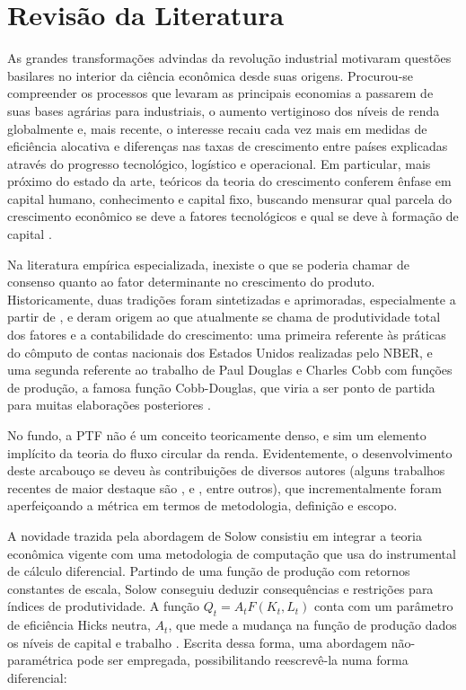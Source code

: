 \documentclass[
  12pt,
  a4paper,
  oneside,
  brazil,
  chapter=TITLE,
  section=TITLE
]{abntex2}
\begin{document}
\chapter{Revisão da Literatura}

As grandes transformações advindas da revolução industrial motivaram questões basilares no interior da ciência econômica desde suas origens. Procurou-se compreender os processos que levaram as principais economias a passarem de suas bases agrárias para industriais, o aumento vertiginoso dos níveis de renda globalmente e, mais recente, o interesse recaiu cada vez mais em medidas de eficiência alocativa e diferenças nas taxas de crescimento entre países explicadas através do progresso tecnológico, logístico e operacional. Em particular, mais próximo do estado da arte, teóricos da teoria do crescimento conferem ênfase em capital humano, conhecimento e capital fixo, buscando mensurar qual parcela do crescimento econômico se deve a fatores tecnológicos e qual se deve à formação de capital \cite{hulten2001}.

Na literatura empírica especializada, inexiste o que se poderia chamar de consenso quanto ao fator determinante no crescimento do produto. Historicamente, duas tradições foram sintetizadas e aprimoradas, especialmente a partir de , e deram origem ao que atualmente se chama de produtividade total dos fatores e a contabilidade do crescimento: uma primeira referente às práticas do cômputo de contas nacionais dos Estados Unidos realizadas pelo NBER, e uma segunda referente ao trabalho de Paul Douglas e Charles Cobb com funções de produção, a famosa função Cobb-Douglas, que viria a ser ponto de partida para muitas elaborações posteriores \cite{griliches1996}.

No fundo, a PTF não é um conceito teoricamente denso, e sim um elemento implícito da teoria do fluxo circular da renda. Evidentemente, o desenvolvimento deste arcabouço se deveu às contribuições de diversos autores (alguns trabalhos recentes de maior destaque são ,  e , entre outros), que incrementalmente foram aperfeiçoando a métrica em termos de metodologia, definição e escopo.

A novidade trazida pela abordagem de Solow consistiu em integrar a teoria econômica vigente com uma metodologia de computação que usa do instrumental de cálculo diferencial. Partindo de uma função de produção com retornos constantes de escala, Solow conseguiu deduzir consequências e restrições para índices de produtividade. A função $Q_t = A_t F(K_t, L_t)$ conta com um parâmetro de eficiência Hicks neutra, $A_t$, que mede a mudança na função de produção dados os níveis de capital e trabalho \cite{tavares2001}. Escrita dessa forma, uma abordagem não-paramétrica pode ser empregada, possibilitando reescrevê-la numa forma diferencial:
\end{document}
